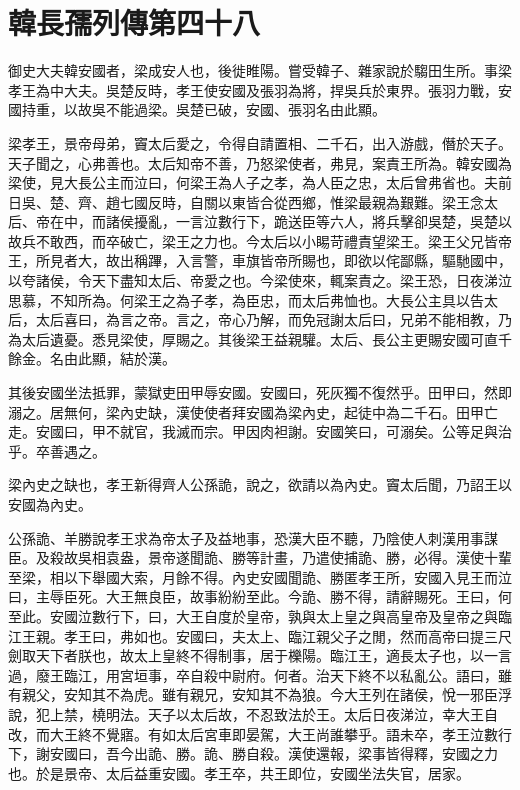 \chapter{韓長孺列傳第四十八}

御史大夫韓安國者，梁成安人也，後徙睢陽。嘗受韓子、雜家說於騶田生所。事梁孝王為中大夫。吳楚反時，孝王使安國及張羽為將，捍吳兵於東界。張羽力戰，安國持重，以故吳不能過梁。吳楚已破，安國、張羽名由此顯。

梁孝王，景帝母弟，竇太后愛之，令得自請置相、二千石，出入游戲，僭於天子。天子聞之，心弗善也。太后知帝不善，乃怒梁使者，弗見，案責王所為。韓安國為梁使，見大長公主而泣曰，何梁王為人子之孝，為人臣之忠，太后曾弗省也。夫前日吳、楚、齊、趙七國反時，自關以東皆合從西鄉，惟梁最親為艱難。梁王念太后、帝在中，而諸侯擾亂，一言泣數行下，跪送臣等六人，將兵擊卻吳楚，吳楚以故兵不敢西，而卒破亡，梁王之力也。今太后以小睗苛禮責望梁王。梁王父兄皆帝王，所見者大，故出稱蹕，入言警，車旗皆帝所賜也，即欲以侘鄙縣，驅馳國中，以夸諸侯，令天下盡知太后、帝愛之也。今梁使來，輒案責之。梁王恐，日夜涕泣思慕，不知所為。何梁王之為子孝，為臣忠，而太后弗恤也。大長公主具以告太后，太后喜曰，為言之帝。言之，帝心乃解，而免冠謝太后曰，兄弟不能相教，乃為太后遺憂。悉見梁使，厚賜之。其後梁王益親驩。太后、長公主更賜安國可直千餘金。名由此顯，結於漢。

其後安國坐法抵罪，蒙獄吏田甲辱安國。安國曰，死灰獨不復然乎。田甲曰，然即溺之。居無何，梁內史缺，漢使使者拜安國為梁內史，起徒中為二千石。田甲亡走。安國曰，甲不就官，我滅而宗。甲因肉袒謝。安國笑曰，可溺矣。公等足與治乎。卒善遇之。

梁內史之缺也，孝王新得齊人公孫詭，說之，欲請以為內史。竇太后聞，乃詔王以安國為內史。

公孫詭、羊勝說孝王求為帝太子及益地事，恐漢大臣不聽，乃陰使人刺漢用事謀臣。及殺故吳相袁盎，景帝遂聞詭、勝等計畫，乃遣使捕詭、勝，必得。漢使十輩至梁，相以下舉國大索，月餘不得。內史安國聞詭、勝匿孝王所，安國入見王而泣曰，主辱臣死。大王無良臣，故事紛紛至此。今詭、勝不得，請辭賜死。王曰，何至此。安國泣數行下，曰，大王自度於皇帝，孰與太上皇之與高皇帝及皇帝之與臨江王親。孝王曰，弗如也。安國曰，夫太上、臨江親父子之閒，然而高帝曰提三尺劍取天下者朕也，故太上皇終不得制事，居于櫟陽。臨江王，適長太子也，以一言過，廢王臨江，用宮垣事，卒自殺中尉府。何者。治天下終不以私亂公。語曰，雖有親父，安知其不為虎。雖有親兄，安知其不為狼。今大王列在諸侯，悅一邪臣浮說，犯上禁，橈明法。天子以太后故，不忍致法於王。太后日夜涕泣，幸大王自改，而大王終不覺寤。有如太后宮車即晏駕，大王尚誰攀乎。語未卒，孝王泣數行下，謝安國曰，吾今出詭、勝。詭、勝自殺。漢使還報，梁事皆得釋，安國之力也。於是景帝、太后益重安國。孝王卒，共王即位，安國坐法失官，居家。

